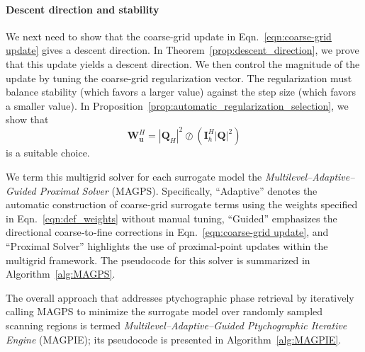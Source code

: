 \documentclass{article}
\numberwithin{equation}{section}
\begin{document}
\paragraph{Descent direction and stability}
We next need to show that the coarse-grid update in Eqn.~\eqref{eqn:coarse-grid update} gives a descent direction. In Theorem~\ref{prop:descent_direction}, we prove that this update yields a descent direction. We then control the magnitude of the update by tuning the coarse‐grid regularization vector. The regularization must balance stability (which favors a larger value) against the step size (which favors a smaller value). In Proposition~\ref{prop:automatic_regularization_selection}, we show that
\[
\bm{W}_{\bm{u}}^H = |\bm{Q}_H|^2\oslash\left(\bm{I}_h^H|\bm{Q}|^2\right)
\]
is a suitable choice.

We term this multigrid solver for each surrogate model the \emph{Multilevel--Adaptive--Guided Proximal Solver} (MAGPS). Specifically, ``Adaptive'' denotes the automatic construction of coarse‐grid surrogate terms using the weights specified in  Eqn.~\eqref{eqn:def_weights} without manual tuning, ``Guided'' emphasizes the directional coarse‐to‐fine corrections in  Eqn.~\eqref{eqn:coarse-grid update}, and ``Proximal Solver'' highlights the use of proximal‐point updates within the multigrid framework. The pseudocode for this solver is summarized in Algorithm~\ref{alg:MAGPS}.

The overall approach that addresses ptychographic phase retrieval by iteratively calling MAGPS to minimize the surrogate model over randomly sampled scanning regions is termed \emph{Multilevel--Adaptive--Guided Ptychographic Iterative Engine} (MAGPIE); its pseudocode is presented in Algorithm~\ref{alg:MAGPIE}. 
\end{document}
